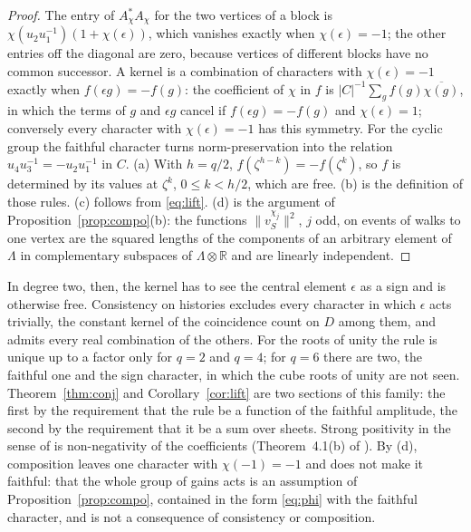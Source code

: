 \begin{proof}
The entry of $A_\chi^*A_\chi$ for the two vertices of a block is $\chi(u_2u_1^{-1})(1+\chi(\epsilon))$, which vanishes exactly when $\chi(\epsilon)=-1$; the other entries off the diagonal are zero, because vertices of different blocks have no common successor. A kernel is a combination of characters with $\chi(\epsilon)=-1$ exactly when $f(\epsilon g)=-f(g)$: the coefficient of $\chi$ in $f$ is $\lvert C\rvert^{-1}\sum_gf(g)\overline{\chi(g)}$, in which the terms of $g$ and $\epsilon g$ cancel if $f(\epsilon g)=-f(g)$ and $\chi(\epsilon)=1$; conversely every character with $\chi(\epsilon)=-1$ has this symmetry. For the cyclic group the faithful character turns norm-preservation into the relation $u_4u_3^{-1}=-u_2u_1^{-1}$ in $C$. (a) With $h=q/2$, $f(\zeta^{h-k})=-f(\zeta^k)$, so $f$ is determined by its values at $\zeta^k$, $0\le k<h/2$, which are free. (b) is the definition of those rules. (c) follows from \eqref{eq:lift}. (d) is the argument of Proposition~\ref{prop:compo}(b): the functions $\lVert v^{\chi_j}_S\rVert^2$, $j$ odd, on events of walks to one vertex are the squared lengths of the components of an arbitrary element of $\Lambda$ in complementary subspaces of $\Lambda\otimes\mathbb{R}$ and are linearly independent.
\end{proof}

In degree two, then, the kernel has to see the central element $\epsilon$ as a sign and is otherwise free. Consistency on histories excludes every character in which $\epsilon$ acts trivially, the constant kernel of the coincidence count on $D$ among them, and admits every real combination of the others. For the roots of unity the rule is unique up to a factor only for $q=2$ and $q=4$; for $q=6$ there are two, the faithful one and the sign character, in which the cube roots of unity are not seen. Theorem~\ref{thm:conj} and Corollary~\ref{cor:lift} are two sections of this family: the first by the requirement that the rule be a function of the faithful amplitude, the second by the requirement that it be a sum over sheets. Strong positivity in the sense of \cite{g8} is non-negativity of the coefficients (Theorem~4.1(b) of \cite{g8}). By (d), composition leaves one character with $\chi(-1)=-1$ and does not make it faithful: that the whole group of gains acts is an assumption of Proposition~\ref{prop:compo}, contained in the form \eqref{eq:phi} with the faithful character, and is not a consequence of consistency or composition.

